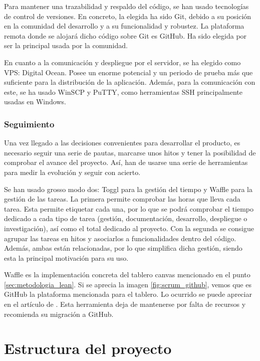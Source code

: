 Para mantener una trazabilidad y respaldo del código, se han usado tecnologías de control de versiones. En concreto, la elegida ha sido Git, debido a su posición en la comunidad del desarrollo y a su funcionalidad y robustez. La plataforma remota donde se alojará dicho código sobre Git es GitHub. Ha sido elegida por ser la principal usada por la comunidad.

En cuanto a la comunicación y despliegue por el servidor, se ha elegido como VPS: Digital Ocean. Posee un enorme potencial y un periodo de prueba más que suficiente para la distribución de la aplicación. Además, para la comunicación con este, se ha usado WinSCP y PuTTY, como herramientas SSH principalmente usadas en Windows.

\subsubsection{Seguimiento}

Una vez llegado a las decisiones convenientes para desarrollar el producto, es necesario seguir una serie de pautas, marcarse unos hitos y tener la posibilidad de comprobar el avance del proyecto. Así, han de usarse una serie de herramientas para medir la evolución y seguir con acierto.

Se han usado grosso modo dos: Toggl para la gestión del tiempo y Waffle para la gestión de las tareas. La primera permite comprobar las horas que lleva cada tarea. Esta permite etiquetar cada una, por lo que se podrá comprobar el tiempo dedicado a cada tipo de tarea (gestión, documentación, desarrollo, despliegue o investigación), así como el total dedicado al proyecto. Con la segunda se consigue agrupar las tareas en hitos y asociarlos a funcionalidades dentro del código. Además, ambas están relacionadas, por lo que simplifica dicha gestión, siendo esta la principal motivación para su uso.

Waffle es la implementación concreta del tablero canvas mencionado en el punto \ref{sec:metodologia_lean}. Si se aprecia la imagen \ref{fig:scrum_github}, vemos que es GitHub la plataforma mencionada para el tablero. Lo ocurrido se puede apreciar en el artículo de . Esta herramienta deja de mantenerse por falta de recursos y recomienda su migración a GitHub.

\section{Estructura del proyecto}\label{sec:estructra_proyecto}

